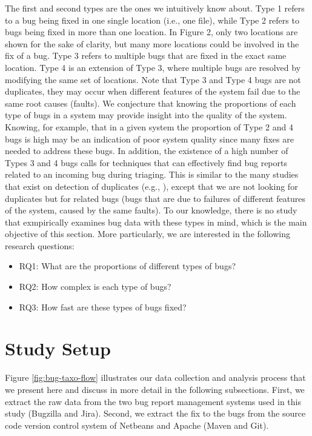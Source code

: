 The first and second types are the ones we intuitively know
about. Type 1 refers to a bug being fixed in one single location
(i.e., one file), while Type 2 refers to bugs being fixed in more
than one location. In Figure 2, only two locations are shown
for the sake of clarity, but many more locations could be
involved in the fix of a bug. Type 3 refers to multiple bugs that
are fixed in the exact same location. Type 4 is an extension of
Type 3, where multiple bugs are resolved by modifying the
same set of locations. Note that Type 3 and Type 4 bugs are
not duplicates, they may occur when different features of the
system fail due to the same root causes (faults).
We conjecture that knowing the proportions of each type
of bugs in a system may provide insight into the quality of the
system. Knowing, for example, that in a given system the
proportion of Type 2 and 4 bugs is high may be an indication
of poor system quality since many fixes are needed to address
these bugs. In addition, the existence of a high number of
Types 3 and 4 bugs calls for techniques that can effectively
find bug reports related to an incoming bug during triaging.
This is similar to the many studies that exist on detection of
duplicates (e.g., \cite{Runeson2007,Sun2010,Nguyen2012}), except that we are not looking for
duplicates but for related bugs (bugs that are due to failures of
different features of the system, caused by the same faults). To
our knowledge, there is no study that exmpirically examines
bug data with these types in mind, which is the main objective
of this section. More particularly, we are interested in the
following research questions:

\begin{itemize}
	\item RQ1: What are the proportions of different types of bugs?
	\item RQ2: How complex is each type of bugs?
	\item RQ3: How fast are these types of bugs fixed?
\end{itemize}


\section{Study Setup}

Figure \ref{fig:bug-taxo-flow} illustrates our data collection and analysis
process that we present here and discuss in more detail in the
following subsections. First, we extract the raw data from the
two bug report management systems used in this study
(Bugzilla and Jira). Second, we extract the fix to the bugs
from the source code version control system of Netbeans and
Apache (Maven and Git).

